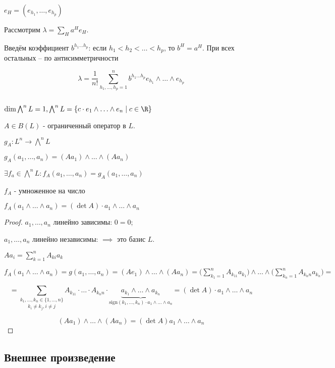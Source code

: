   $e_H = (e_{h_1}, \dotsc, e_{h_p})$

  Рассмотрим $\lambda = \sum_H a^He_H$.

  Введём коэффициент $b^{h_1\dotsc h_p}$: если $h_1<h_2<\dotsc<h_p$, то $b^H = a^H$. При всех остальных -- по антисимметричности

  $$\lambda = \frac{1}{n!}\sum^n_{h_1,\dotsc, h_p = 1} b^{h_1\dotsc h_p} e_{h_1} \land \dotsc \land e_{h_p}$$

  \par $ $

  $\dim \bigwedge^n L = 1, \bigwedge^nL = \{c\cdot e_1 \land \dotsc \land e_n \mid c \in \R\}$

  $A \in B(L)$ - ограниченный оператор в $L$.
  
  $g_A: L^n \to \bigwedge^n L$

  $g_A (a_1, \dotsc, a_n) = (Aa_1)\land \dotsc \land (Aa_n)$

  $\exists f_a \in \bigwedge^n L : f_A(a_1, \dotsc, a_n) = g_A(a_1, \dotsc, a_n)$
  
  $f_A$ - умноженное на число 

  \begin{remark}
    $f_A(a_1 \land \dotsc \land a_n) = (\det A)\cdot a_1 \land\dotsc\land a_n$
  \end{remark}

  \begin{proof}
    $a_1,\dotsc, a_n$ линейно зависимы: $0 = 0$;

    $a_1, \dotsc, a_n$ линейно независимы: $\implies $ это базис $L$.

    $Aa_i = \sum^n_{k=1} A_{ki}a_k$

    $f_A(a_1 \land \dotsc \land a_n) = g(a_1, \dotsc, a_n) = (Ae_1) \land \dotsc \land (Aa_n) = \Big(\sum^n_{k_1=1} A_{k_11} a_{k_1}\Big) \land \dotsc \land \Big( \sum^n_{k_n=1} A_{k_nn} a_{k_n} \Big) =$

    $$= \underset{k_i\neq k_j, i \neq j}{\sum_{k_1,\dotsc,k_n \in \{1, \dotsc, n\}}} A_{k_11}\cdot \dotsc \cdot A_{k_nn}\cdot \underbrace{a_{k_1} \land \dots \land a_{k_n}}_{\text{sign}(k_1,\dotsc, k_n)\cdot a_1\land\dotsc\land a_n} = (\det A)\cdot a_1\land\dotsc\land a_n$$

    $$(Aa_1)\land \dotsc \land (Aa_n) = (\det A) a_1\land \dotsc \land a_n$$
  \end{proof}
  
  \subsection*{Внешнее произведение}

